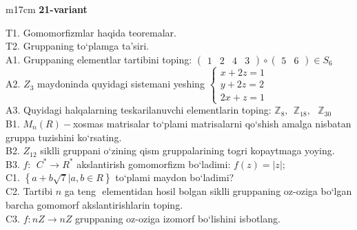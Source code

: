 \documentclass{article}
\begin{document}
\begin{tabular}{m{17cm}}
\textbf{21-variant}
\newline

T1. Gomomorfizmlar haqida teoremalar. \\
T2. Gruppaning to`plamga ta'siri. \\
A1. Gruppaning elementlar tartibini toping: \(\begin{pmatrix}
1 & 2 & 4 & 3
\end{pmatrix} \circ \begin{pmatrix}
5 & 6
\end{pmatrix} \in S_{6}\) \\
A2. \(Z_{3}\) maydoninda quyidagi sistemani yeshing \(\left\{ \begin{matrix}
x + 2z = 1 \\
y + 2z = 2 \\
2x + z = 1
\end{matrix} \right.\ \) \\
A3. Quyidagi halqalarning teskarilanuvchi elementlarin toping: \(\mathbb{Z}_{8},\ \ \mathbb{Z}_{18},\ \ \ \mathbb{Z}_{30}\) \\
B1. \(M_{n}(R) -\)xosmas matrisalar to`plami matrisalarni qo`shish amalga nisbatan gruppa tuzishini ko`rsating. \\
B2. \(Z_{12}\) siklli gruppani o`zining qism gruppalarining tog\textquotesingle ri kopaytmaga yoying. \\
B3. \(f:\ \ C^{*} \rightarrow R^{*}\) akslantirish gomomorfizm bo`ladimi: \(f(z) = |z|;\) \\
C1. \(\left\{ a + b\sqrt{7}|a,b \in R \right\}\) to`plami maydon bo`ladimi? \\
C2. Tartibi \(n\) ga teng \(< a >\) elementidan hosil bo\textquotesingle lgan siklli gruppaning o\textquotesingle z-o\textquotesingle ziga bo`lgan barcha gomomorf akslantirishlarin toping. \\
C3. \(f:nZ \rightarrow nZ\) gruppaning o\textquotesingle z-o\textquotesingle ziga izomorf bo`lishini isbotlang. \\

\end{tabular}
\vspace{1cm}
\end{document}
